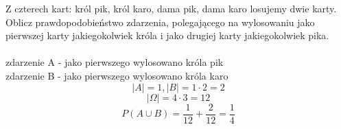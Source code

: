 \medskip
{} 
\medskip

Z czterech kart: król pik, król karo, dama pik, dama karo losujemy dwie karty. Oblicz prawdopodobieństwo zdarzenia, polegającego
na wylosowaniu jako pierwszej karty jakiegokolwiek króla i jako drugiej karty jakiegokolwiek pika. \\
\\
zdarzenie A - jako pierwszego wylosowano króla pik \\
zdarzenie B - jako pierwszego wylosowano króla karo \\
\[
|A| = 1 , |B| = 1 \cdot 2 = 2 
\]
\[
|\Omega| = 4 \cdot 3 = 12
\]
\[
P(A \cup B) = \frac{1}{12} + \frac{2}{12} = \frac{1}{4}
\]
